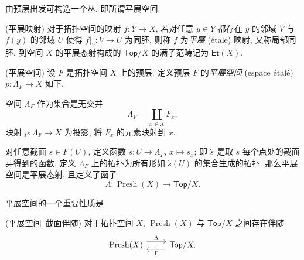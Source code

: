 由预层出发可构造一个丛, 即所谓平展空间.

\begin{definition}
    {(平展映射)}
    对于拓扑空间的映射 $f \colon Y \to X$,
    若对任意 $y\in Y$ 都存在 $y$ 的邻域 $V$ 与 $f(y)$ 的邻域 $U$ 使得 $f|_V \colon V \to U$ 为同胚,
    则称 $f$ 为\emph{平展} (étale) 映射, 又称局部同胚.
    到空间 $X$ 的平展态射构成的 $\mathsf {Top}/X$ 的满子范畴记为 $\mathsf {Et}(X)$.
\end{definition}

\begin{propdef}
    {(平展空间)}
    设 $F$ 是拓扑空间 $X$ 上的预层. 定义预层 $F$ 的\emph{平展空间} (espace étalé)
    $p \colon \Lambda_F \to X$ 如下.

    空间 $\Lambda_F$ 作为集合是无交并
    $$
    \Lambda_F = \coprod_{x\in X} F_x,
    $$
    映射 $p \colon \Lambda_F \to X$ 为投影, 将 $F_x$ 的元素映射到 $x$.
    
    对任意截面 $s\in F(U)$, 定义函数 $\dot{s} \colon U \to \Lambda_F$, $x\mapsto s_x$; 即 $\dot s$ 是取 $s$ 每个点处的截面芽得到的函数.
    定义 $\Lambda_F$ 上的拓扑为所有形如 $\dot{s}(U)$ 的集合生成的拓扑.
    那么平展空间是平展态射, 且定义了函子
    $$
    \Lambda \colon \operatorname{Presh}(X) \to \mathsf {Top}/X.
    $$
\end{propdef}

平展空间的一个重要性质是

\begin{prop}
    [label={etale-section-adjoint}]
    {(平展空间--截面伴随)}
    对于拓扑空间 $X$, $\operatorname{Presh}(X)$ 与 $\mathsf {Top}/X$ 之间存在伴随
    \[\begin{tikzcd}[ampersand replacement=\&]
    	{\operatorname{Presh}(X)} \& {\mathsf {Top}/X.}
    	\arrow[""{name=0, anchor=center, inner sep=0}, "\Gamma", shift left=2, from=1-2, to=1-1]
    	\arrow[""{name=1, anchor=center, inner sep=0}, "\Lambda", shift left=2, from=1-1, to=1-2]
    	\arrow["\dashv"{anchor=center, rotate=-90}, draw=none, from=1, to=0]
    \end{tikzcd}\]
\end{prop}


